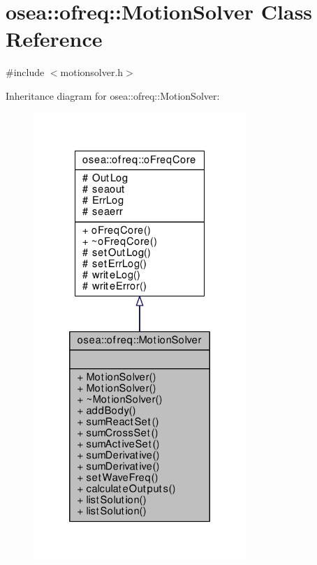 \hypertarget{classosea_1_1ofreq_1_1_motion_solver}{\section{osea\-:\-:ofreq\-:\-:Motion\-Solver Class Reference}
\label{classosea_1_1ofreq_1_1_motion_solver}
}


{\ttfamily \#include $<$motionsolver.\-h$>$}



Inheritance diagram for osea\-:\-:ofreq\-:\-:Motion\-Solver\-:\nopagebreak
\begin{figure}[H]
\begin{center}
\leavevmode
\includegraphics[width=228pt]{classosea_1_1ofreq_1_1_motion_solver__inherit__graph}
\end{center}
\end{figure}
